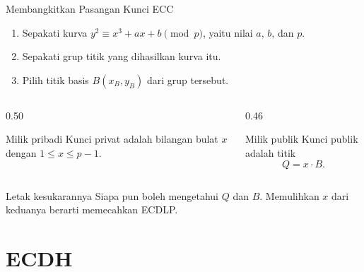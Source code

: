 \documentclass[aspectratio=169,11pt]{beamer}
\begin{document}
\begin{frame}{Membangkitkan Pasangan Kunci ECC}
    \begin{enumerate}
        \item Sepakati kurva $y^2 \equiv x^3 + ax + b \pmod p$, yaitu nilai
              $a$, $b$, dan $p$.
        \item Sepakati grup titik yang dihasilkan kurva itu.
        \item Pilih titik basis $B(x_B,y_B)$ dari grup tersebut.
    \end{enumerate}
    \vspace{0.1cm}
    \begin{columns}[T,onlytextwidth]
        \begin{column}{0.50\textwidth}
            \begin{block}{Milik pribadi}
                \footnotesize
                Kunci privat adalah bilangan bulat $x$ dengan
                $1 \le x \le p-1$.
            \end{block}
        \end{column}
        \begin{column}{0.46\textwidth}
            \begin{block}{Milik publik}
                \footnotesize
                Kunci publik adalah titik
                \[
                    Q = x \cdot B .
                \]
            \end{block}
        \end{column}
    \end{columns}
    \vspace{0.1cm}
    \begin{alertblock}{Letak kesukarannya}
        \footnotesize
        Siapa pun boleh mengetahui $Q$ dan $B$. Memulihkan $x$ dari keduanya
        berarti memecahkan ECDLP.
    \end{alertblock}
\end{frame}

\section{ECDH}
\end{document}

